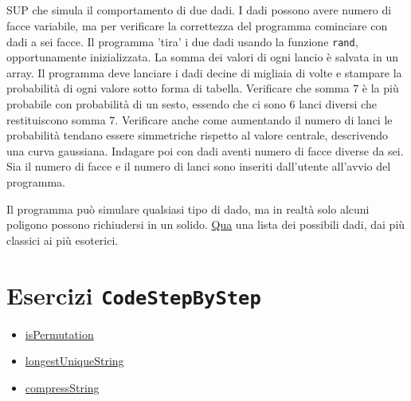 \documentclass{article}
\begin{document}
\subsection{}
SUP che simula il comportamento di due dadi. I dadi possono avere numero di facce variabile, ma per verificare la correttezza del programma cominciare con dadi a sei facce. Il programma 'tira' i due dadi usando la funzione \texttt{rand}, opportunamente inizializzata. La somma dei valori di ogni lancio è salvata in un array. Il programma deve lanciare i dadi decine di migliaia di volte e stampare la probabilità di ogni valore sotto forma di tabella. Verificare che somma 7 è la più probabile con probabilità di un sesto, essendo che ci sono 6 lanci diversi che restituiscono somma 7. Verificare anche come aumentando il numero di lanci le probabilità tendano essere simmetriche rispetto al valore centrale, descrivendo una curva gaussiana. Indagare poi con dadi aventi numero di facce diverse da sei. Sia il numero di facce e il numero di lanci sono inseriti dall'utente all'avvio del programma.
\begin{info} 
	Il programma può simulare qualsiasi tipo di dado, ma in realtà solo alcuni poligono possono richiudersi in un solido. \href{https://en.wikipedia.org/wiki/Dice#Variants}{Qua} una lista dei possibili dadi, dai più classici ai più esoterici.
\end{info}



\section*{Esercizi \texttt{CodeStepByStep}}
\begin{itemize}
	\item \href{https://www.codestepbystep.com/problem/view/cpp/algorithms/isPermutation}{isPermutation}
	\item \href{https://www.codestepbystep.com/problem/view/cpp/algorithms/longestUniqueString}{longestUniqueString}
	\item \href{https://www.codestepbystep.com/problem/view/cpp/algorithms/compressString}{compressString}
\end{itemize}
\end{document}
